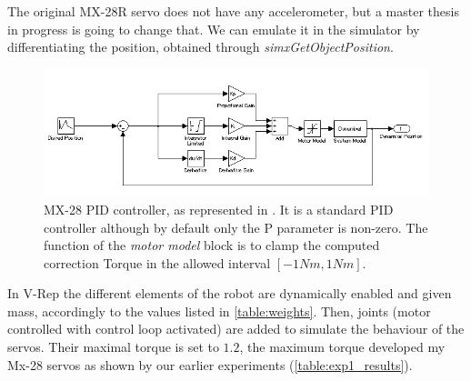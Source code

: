 The original MX-28R servo does not have any accelerometer, but a master thesis in progress is going to change that. We can emulate it in the simulator by differentiating the position, obtained through \emph{simxGetObjectPosition}. 

\begin{figure}[htp]
\center
    \includegraphics[width = \textwidth]{figures/pidcontrol}
    \caption[MX-28 PID controller]{MX-28 PID controller, as represented in \cite{mx_28_manual}. It is a standard PID controller although by default only the P parameter is non-zero. The function of the \textit{motor model} block is to clamp the computed correction Torque in the allowed interval $[-1Nm, 1Nm]$. }
    \label{fig:mx28_pid}
\end{figure}

In V-Rep the different elements of the robot are dynamically enabled and given mass, accordingly to the values listed in \cref{table:weights}. Then, joints (motor controlled with control loop activated) are added to simulate the behaviour of the servos. Their maximal torque is set to $1.2$, the maximum torque developed my Mx-28 servos as shown by our earlier experiments (\cref{table:exp1_results}). 
